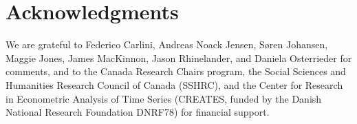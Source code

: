 \documentclass[article]{jss}
\begin{document}
\section*{Acknowledgments}


We are grateful to Federico Carlini, Andreas Noack Jensen, S\o ren Johansen, Maggie Jones, James MacKinnon, Jason Rhinelander, and Daniela Osterrieder for comments, and to the Canada Research Chairs program, the Social Sciences and Humanities Research Council of Canada (SSHRC), and the Center for Research in Econometric Analysis of Time Series (CREATES, funded by the Danish National Research Foundation DNRF78) for financial support.








\newpage
\end{document}
